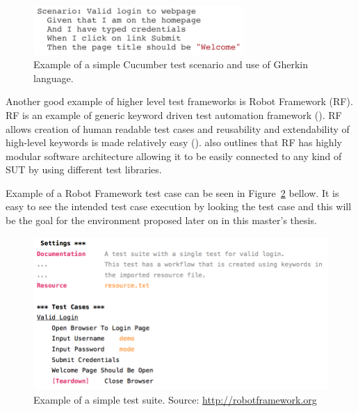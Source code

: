 \begin{figure}[ht]
  \begin{center}
    \includegraphics[width=8cm]{images/cucumber_example.png}
    \caption{Example of a simple Cucumber test scenario and use of Gherkin language.}
    \label{fig:cucumber}
  \end{center}
\end{figure}
\FloatBarrier

Another good example of higher level test frameworks is Robot Framework (RF). RF is an example of generic keyword driven test automation framework (\emph{\cite{robotframework}}). RF allows creation of human readable test cases and reusability and extendability of high-level keywords is made relatively easy (\emph{\cite{stresnjak2011usage}}). \emph{\cite{Rfuserguide}} also outlines that RF has highly modular software architecture allowing it to be easily connected to any kind of SUT by using different test libraries.

Example of a Robot Framework test case can be seen in Figure~\ref{fig:robot_example} bellow. It is easy to see the intended test case execution by looking the test case and this will be the goal for the environment proposed later on in this master's thesis.

\begin{figure}[ht]
  \begin{center}
    \includegraphics[width=12cm]{images/robot_example.png}
    \caption{Example of a simple test suite. Source: \url{http://robotframework.org}}
    \label{fig:robot_example}
  \end{center}
\end{figure}
\FloatBarrier
